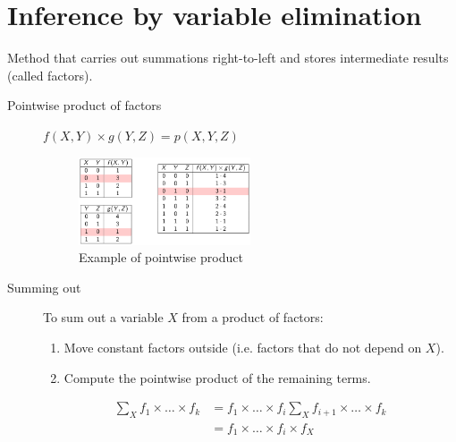\section{Inference by variable elimination}
Method that carries out summations right-to-left and stores intermediate results (called factors).

\begin{description}
    \item[Pointwise product of factors] $f(X, Y) \times g(Y, Z) = p(X, Y, Z)$
        \begin{figure}[h]
            \centering
            \includegraphics[width=0.5\textwidth]{img/_pointwise_factors.pdf}
            \caption{Example of pointwise product}
        \end{figure}

    \item[Summing out]
        To sum out a variable $X$ from a product of factors:
        \begin{enumerate}
            \item Move constant factors outside (i.e. factors that do not depend on $X$).
            \item Compute the pointwise product of the remaining terms.
        \end{enumerate}

        \begin{example}
            \[ 
                \begin{split}
                    \sum_X f_1 \times \dots \times f_k &= f_1 \times \dots \times f_i \sum_X f_{i+1} \times \dots \times f_k \\
                        &= f_1 \times \dots \times f_i \times f_X
                \end{split}    
            \]
        \end{example}
\end{description}

